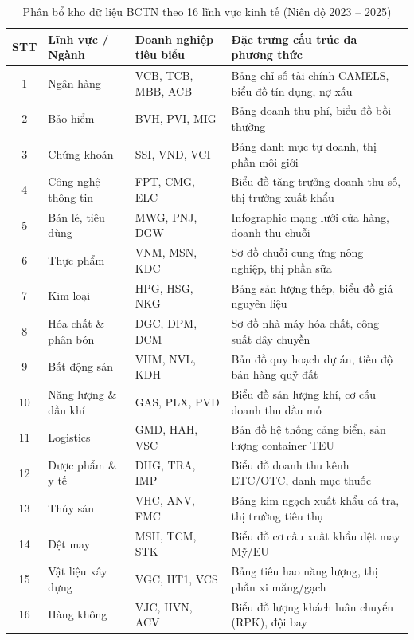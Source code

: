 \documentclass[a4paper,12pt]{article}
\begin{document}
\begin{table}[htbp]
    \centering
    \small
    \caption{Phân bổ kho dữ liệu BCTN theo 16 lĩnh vực kinh tế (Niên độ 2023 -- 2025)}
    \vspace{0.2cm}
    \begin{tabularx}{\textwidth}{cllX}
        \toprule
        \textbf{STT} & \textbf{Lĩnh vực / Ngành} & \textbf{Doanh nghiệp tiêu biểu} & \textbf{Đặc trưng cấu trúc đa phương thức} \\
        \midrule
        1 & Ngân hàng & VCB, TCB, MBB, ACB & Bảng chỉ số tài chính CAMELS, biểu đồ tín dụng, nợ xấu \\
        2 & Bảo hiểm & BVH, PVI, MIG & Bảng doanh thu phí, biểu đồ bồi thường \\
        3 & Chứng khoán & SSI, VND, VCI & Bảng danh mục tự doanh, thị phần môi giới \\
        4 & Công nghệ thông tin & FPT, CMG, ELC & Biểu đồ tăng trưởng doanh thu số, thị trường xuất khẩu \\
        5 & Bán lẻ, tiêu dùng & MWG, PNJ, DGW & Infographic mạng lưới cửa hàng, doanh thu chuỗi \\
        6 & Thực phẩm & VNM, MSN, KDC & Sơ đồ chuỗi cung ứng nông nghiệp, thị phần sữa \\
        7 & Kim loại & HPG, HSG, NKG & Bảng sản lượng thép, biểu đồ giá nguyên liệu \\
        8 & Hóa chất \& phân bón & DGC, DPM, DCM & Sơ đồ nhà máy hóa chất, công suất dây chuyền \\
        9 & Bất động sản & VHM, NVL, KDH & Bản đồ quy hoạch dự án, tiến độ bán hàng quỹ đất \\
        10 & Năng lượng \& dầu khí & GAS, PLX, PVD & Biểu đồ sản lượng khí, cơ cấu doanh thu dầu mỏ \\
        11 & Logistics & GMD, HAH, VSC & Bản đồ hệ thống cảng biển, sản lượng container TEU \\
        12 & Dược phẩm \& y tế & DHG, TRA, IMP & Biểu đồ doanh thu kênh ETC/OTC, danh mục thuốc \\
        13 & Thủy sản & VHC, ANV, FMC & Bảng kim ngạch xuất khẩu cá tra, thị trường tiêu thụ \\
        14 & Dệt may & MSH, TCM, STK & Biểu đồ cơ cấu xuất khẩu dệt may Mỹ/EU \\
        15 & Vật liệu xây dựng & VGC, HT1, VCS & Bảng tiêu hao năng lượng, thị phần xi măng/gạch \\
        16 & Hàng không & VJC, HVN, ACV & Biểu đồ lượng khách luân chuyển (RPK), đội bay \\
        \bottomrule
    \end{tabularx}
\end{table}
\end{document}
